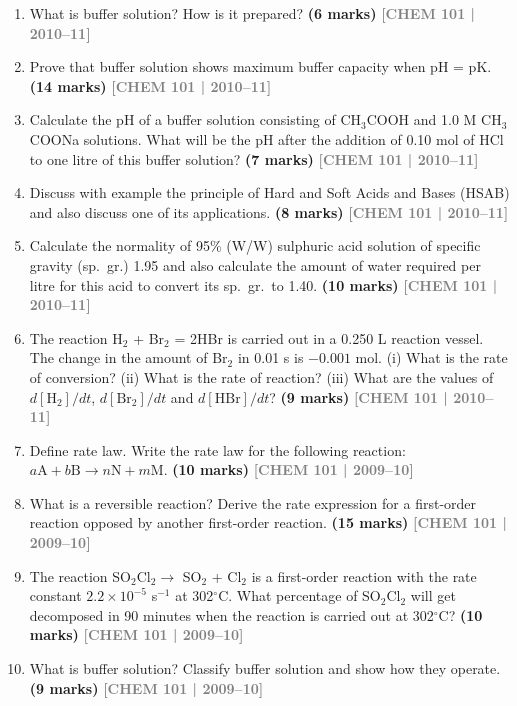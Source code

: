 \documentclass[12pt,a3paper]{article}
\newcommand{\yr}[1]{\hfill\textcolor{gray}{\small\textbf{[#1]}}}
\newcommand{\mk}[1]{\textcolor{orange!70!black}{\small\textbf{(#1 marks)}}}
\begin{document}
\begin{enumerate}
\item What is buffer solution? How is it prepared? \mk{6}
\yr{CHEM 101 | 2010--11}

\item Prove that buffer solution shows maximum buffer capacity when pH = pK. \mk{14}
\yr{CHEM 101 | 2010--11}

\item Calculate the pH of a buffer solution consisting of CH$_3$COOH and 1.0 M CH$_3$COONa solutions. What will be the pH after the addition of 0.10 mol of HCl to one litre of this buffer solution? \mk{7}
\yr{CHEM 101 | 2010--11}

\item Discuss with example the principle of Hard and Soft Acids and Bases (HSAB) and also discuss one of its applications. \mk{8}
\yr{CHEM 101 | 2010--11}

\item Calculate the normality of 95\% (W/W) sulphuric acid solution of specific gravity (sp.\ gr.) 1.95 and also calculate the amount of water required per litre for this acid to convert its sp.\ gr.\ to 1.40. \mk{10}
\yr{CHEM 101 | 2010--11}

\item The reaction H$_2$ + Br$_2$ = 2HBr is carried out in a 0.250 L reaction vessel. The change in the amount of Br$_2$ in 0.01 s is $-0.001$ mol. (i) What is the rate of conversion? (ii) What is the rate of reaction? (iii) What are the values of $d[\text{H}_2]/dt$, $d[\text{Br}_2]/dt$ and $d[\text{HBr}]/dt$? \mk{9}
\yr{CHEM 101 | 2010--11}

\item Define rate law. Write the rate law for the following reaction: $a\text{A} + b\text{B} \rightarrow n\text{N} + m\text{M}$. \mk{10}
\yr{CHEM 101 | 2009--10}

\item What is a reversible reaction? Derive the rate expression for a first-order reaction opposed by another first-order reaction. \mk{15}
\yr{CHEM 101 | 2009--10}

\item The reaction SO$_2$Cl$_2 \rightarrow$ SO$_2$ + Cl$_2$ is a first-order reaction with the rate constant $2.2 \times 10^{-5}$ s$^{-1}$ at 302$^\circ$C. What percentage of SO$_2$Cl$_2$ will get decomposed in 90 minutes when the reaction is carried out at 302$^\circ$C? \mk{10}
\yr{CHEM 101 | 2009--10}

\item What is buffer solution? Classify buffer solution and show how they operate. \mk{9}
\yr{CHEM 101 | 2009--10}


\end{enumerate}
\end{document}
